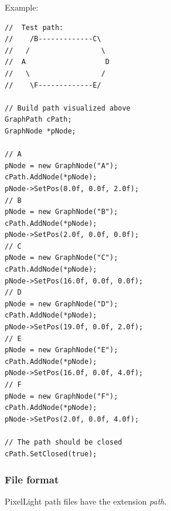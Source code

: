 Example:

\begin{lstlisting}[caption=Path creation example]
//	Test path:
//	  /B-------------C\
//	 /                 \
//	A                   D
//	 \                 /
//	  \F-------------E/

// Build path visualized above
GraphPath cPath;
GraphNode *pNode;

// A
pNode = new GraphNode("A");
cPath.AddNode(*pNode);
pNode->SetPos(0.0f, 0.0f, 2.0f);
// B
pNode = new GraphNode("B");
cPath.AddNode(*pNode);
pNode->SetPos(2.0f, 0.0f, 0.0f);
// C
pNode = new GraphNode("C");
cPath.AddNode(*pNode);
pNode->SetPos(16.0f, 0.0f, 0.0f);
// D
pNode = new GraphNode("D");
cPath.AddNode(*pNode);
pNode->SetPos(19.0f, 0.0f, 2.0f);
// E
pNode = new GraphNode("E");
cPath.AddNode(*pNode);
pNode->SetPos(16.0f, 0.0f, 4.0f);
// F
pNode = new GraphNode("F");
cPath.AddNode(*pNode);
pNode->SetPos(2.0f, 0.0f, 4.0f);

// The path should be closed
cPath.SetClosed(true);
\end{lstlisting}



\subsubsection{File format}
PixelLight path files have the extension \emph{path}.
